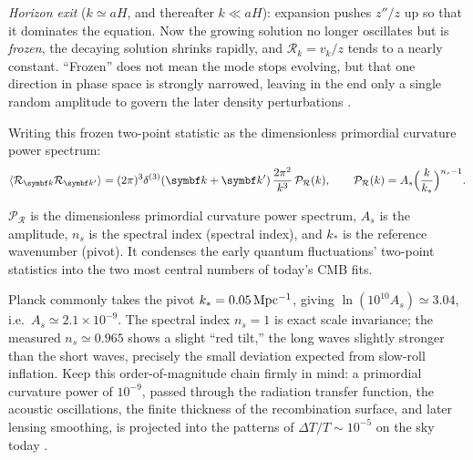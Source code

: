 \emph{Horizon exit} (\(k\simeq aH\), and thereafter \(k\ll aH\)): expansion pushes \(z''/z\) up so that it dominates the equation. Now the growing solution no longer oscillates but is \emph{frozen}, the decaying solution shrinks rapidly, and \(\mathcal R_k=v_k/z\) tends to a nearly constant. ``Frozen'' does not mean the mode stops evolving, but that one direction in phase space is strongly narrowed, leaving in the end only a single random amplitude to govern the later density perturbations \citep{1988JETP...67.1297M,1990PhRvD..42.3413G,1996CQGra..13..377P}.

Writing this frozen two-point statistic as the dimensionless primordial curvature power spectrum:
\begin{equation}
  \langle\mathcal R_{\bm k}\mathcal R_{\bm k'}\rangle
  =(2\pi)^3\delta^{(3)}(\bm k+\bm k')\,\frac{2\pi^2}{k^3}\,\mathcal P_{\mathcal R}(k),
  \qquad
  \mathcal P_{\mathcal R}(k)=A_s\Bigl(\frac{k}{k_*}\Bigr)^{n_s-1} .
  \label{eq:e23-primordial-spectrum}
\end{equation}
\begin{formulaexplain}
\(\mathcal P_{\mathcal R}\) is the dimensionless primordial curvature power spectrum, \(A_s\) is the amplitude, \(n_s\) is the spectral index (spectral index), and \(k_*\) is the reference wavenumber (pivot). It condenses the early quantum fluctuations' two-point statistics into the two most central numbers of today's CMB fits.
\end{formulaexplain}
Planck commonly takes the pivot \(k_*=0.05\,{\rm Mpc^{-1}}\), giving \(\ln(10^{10}A_s)\simeq3.04\), i.e.\ \(A_s\simeq2.1\times10^{-9}\). The spectral index \(n_s=1\) is exact scale invariance; the measured \(n_s\simeq0.965\) shows a slight ``red tilt,'' the long waves slightly stronger than the short waves, precisely the small deviation expected from slow-roll inflation. Keep this order-of-magnitude chain firmly in mind: a primordial curvature power of \(10^{-9}\), passed through the radiation transfer function, the acoustic oscillations, the finite thickness of the recombination surface, and later lensing smoothing, is projected into the patterns of \(\Delta T/T\sim10^{-5}\) on the sky today \citep{2020A&A...641A...6P,2020A&A...641A..10P}.

